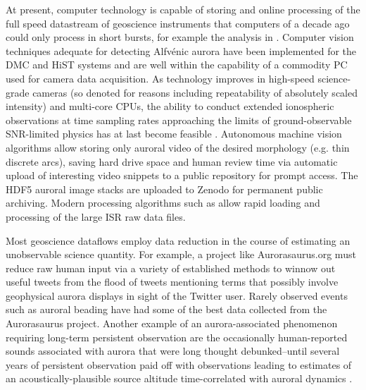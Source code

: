 At present, computer technology is capable of storing and online processing of the full speed datastream of geoscience instruments that computers of a decade ago could only process in short bursts, for example the analysis in \citet{dahlgren2013}.
Computer vision techniques adequate for detecting Alfvénic aurora have been implemented for the DMC and HiST systems and are well within the capability of a commodity PC used for camera data acquisition.
As technology improves in high-speed science-grade cameras (so denoted for reasons including repeatability of absolutely scaled intensity) and multi-core CPUs, the ability to conduct extended ionospheric observations at time sampling rates approaching the limits of ground-observable SNR-limited physics has at last become feasible \citep{hirsch2016}.
Autonomous machine vision algorithms allow storing only auroral video of the desired morphology (e.g. thin discrete arcs), saving hard drive space and human review time via automatic upload of interesting video snippets to a public repository for prompt access.
The HDF5 \citep{hdf5} auroral image stacks are uploaded to Zenodo \citep{zenodo} for permanent public archiving.
Modern processing algorithms such as \citet{isrutils} allow rapid loading and processing of the large ISR raw data files.

Most geoscience dataflows employ data reduction in the course of estimating an unobservable science quantity.
For example, a project like Aurorasaurus.org \citep{macdonald2015} must reduce raw human input via a variety of established methods to winnow out useful tweets from the flood of tweets mentioning terms that possibly involve geophysical aurora displays in sight of the Twitter user.
Rarely observed events such as auroral beading have had some of the best data collected \citep{aurorasaurus-bead} from the Aurorasaurus project.
Another example of an aurora-associated phenomenon requiring long-term persistent observation are the occasionally human-reported sounds associated with aurora that were long thought debunked--until several years of persistent observation paid off with observations leading to estimates of an acoustically-plausible source altitude time-correlated with auroral dynamics \citep{audio2016}.

